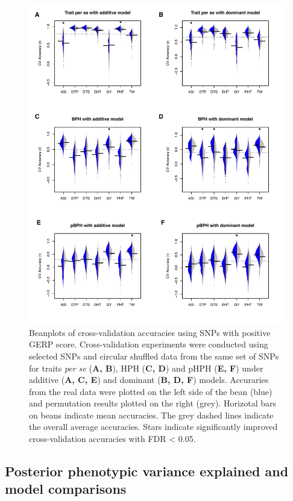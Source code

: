\documentclass[9pt,twocolumn,twoside]{gsajnl}
\begin{document}
\begin{figure}[htbp]
\centering
\includegraphics[width=\linewidth]{Figure_gerpall.pdf}
\caption{Beanplots of cross-validation accuracies using SNPs with positive GERP score. Cross-validation experiments were conducted using selected SNPs and circular shuffled data from the same set of SNPs for traits \emph{per se} (\textbf{A, B}), HPH (\textbf{C, D}) and pHPH (\textbf{E, F}) under additive (\textbf{A, C, E}) and dominant (\textbf{B, D, F}) models. Accuraries from the real data were plotted on the left side of the bean (blue) and permutation results plotted on the right (grey). Horizotal bars on beans indicate mean accuracies. The grey dashed lines indicate the overall average accuracies. Stars indicate significantly improved cross-validation accuracies with FDR < 0.05.}
\label{fig:gerpall}
\end{figure}


\subsection*{Posterior phenotypic variance explained and model comparisons}
\end{document}
